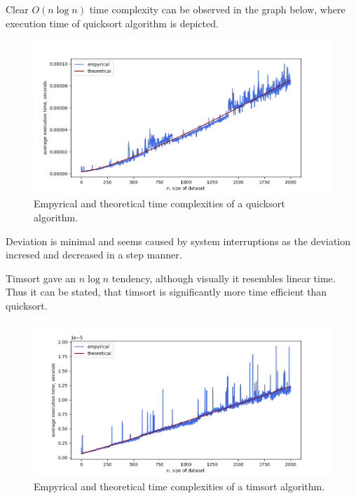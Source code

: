\documentclass[12pt, a4paper]{article}
\begin{document}
Clear $O(n \log n)$ time complexity can be observed in the graph below, where execution time of quicksort algorithm is depicted.
\begin{figure}[!h]
\centering
\includegraphics[width=\textwidth]{quicksort.png}
\caption{Empyrical and theoretical time complexities of a quicksort algorithm.}
\end{figure}
Deviation is minimal and seems caused by system interruptions as the deviation incresed and decreased in a step manner.

\newpage

Timsort gave an $n \log n$ tendency, although visually it resembles linear time. Thus it can be stated, that timsort is significantly more time efficient than quicksort.
\begin{figure}[!h]
\centering
\includegraphics[width=\textwidth]{timsort.png}
\caption{Empyrical and theoretical time complexities of a timsort algorithm.}
\end{figure}
\end{document}
